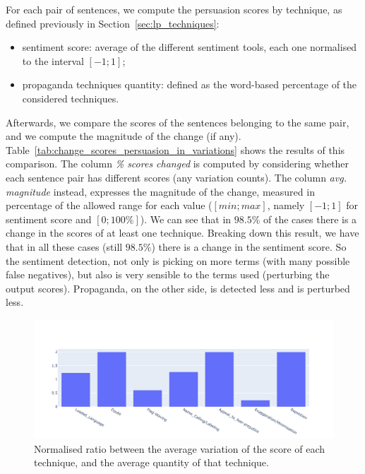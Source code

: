 For each pair of sentences, we compute the persuasion scores by technique, as defined previously in Section~\ref{sec:lp_techniques}:
\begin{itemize}
    \item sentiment score: average of the different sentiment tools, each one normalised to the interval $[-1;1]$;
    \item propaganda techniques quantity: defined as the word-based percentage of the considered techniques.
\end{itemize}
Afterwards, we compare the scores of the sentences belonging to the same pair, and we compute the magnitude of the change (if any).
Table~\ref{tab:change_scores_persuasion_in_variations} shows the results of this comparison.
The column \textit{\% scores changed} is computed by considering whether each sentence pair has different scores (any variation counts). The column \textit{avg. magnitude} instead, expresses the magnitude of the change, measured in percentage of the allowed range for each value ($[min;max]$, namely $[-1;1]$ for sentiment score and $[0;100\%]$).
We can see that in $98.5\%$ of the cases there is a change in the scores of at least one technique.
Breaking down this result, we have that in all these cases (still $98.5\%$) there is a change in the sentiment score. So the sentiment detection, not only is picking on more terms (with many possible false negatives), but also is very sensible to the terms used (perturbing the output scores).
Propaganda, on the other side, is detected less and is perturbed less.

\begin{figure}[!htbp]
    \centering
    \includegraphics[width=\linewidth]{figures/4.3.1_normalised_ratio_scores.pdf}
    \caption{Normalised ratio between the average variation of the score of each technique, and the average quantity of that technique.}
    \label{fig:normalised_ratio_scores_persuasion}
\end{figure}

